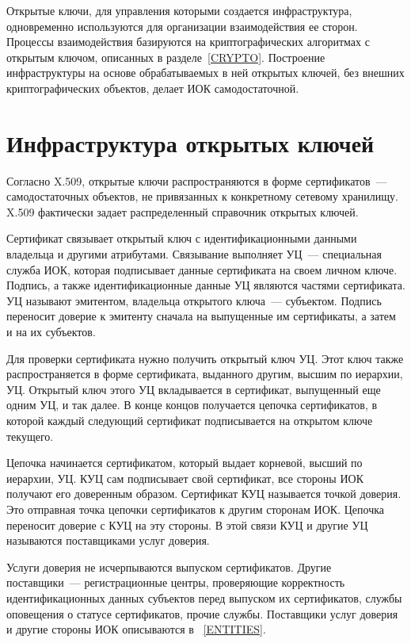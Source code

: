 Открытые ключи, для управления которыми создается инфраструктура,
одновременно используются для организации взаимодействия ее сторон.
%
Процессы взаимодействия базируются на криптографических алгоритмах 
с открытым ключом, описанных в разделе~\ref{CRYPTO}.
%
Построение инфраструктуры на основе обрабатываемых в ней открытых ключей,
без внешних криптографических объектов, делает ИОК самодостаточной.

\section{Инфраструктура открытых ключей}

Согласно X.509, открытые ключи распространяются в форме сертификатов~--- 
самодостаточных объектов, не привязанных к конкретному сетевому хранилищу. 
X.509 фактически задает распределенный справочник открытых ключей.  

Сертификат связывает открытый ключ с идентификационными данными владельца
и другими атрибутами. Связывание выполняет УЦ~--- специальная служба 
ИОК, которая  подписывает данные сертификата на своем личном ключе. Подпись,
а также идентификационные данные УЦ являются частями сертификата.
УЦ называют эмитентом, владельца открытого ключа~--- субъектом. Подпись 
переносит доверие к эмитенту сначала на выпущенные им сертификаты, а затем 
и на их субъектов. 

Для проверки сертификата нужно получить открытый ключ УЦ. 
Этот ключ также распространяется в форме сертификата, выданного другим, 
высшим по иерархии, УЦ. Открытый ключ этого УЦ вкладывается в сертификат,
выпущенный еще одним УЦ, и так далее. В конце концов получается цепочка сертификатов,
в которой каждый следующий сертификат подписывается на открытом ключе текущего.

Цепочка начинается сертификатом, который выдает корневой, высший по 
иерархии, УЦ. КУЦ сам подписывает свой сертификат, все стороны ИОК
получают его доверенным образом. Сертификат КУЦ называется точкой доверия. 
Это отправная точка цепочки сертификатов к другим сторонам ИОК. 
Цепочка переносит доверие с КУЦ на эту стороны. В этой связи КУЦ и другие 
УЦ называются поставщиками услуг доверия.

Услуги доверия не исчерпываются выпуском сертификатов.
Другие поставщики~--- регистрационные центры, проверяющие корректность 
идентификационных данных субъектов перед выпуском их сертификатов,
службы оповещения о статусе сертификатов, прочие службы.
%
Поставщики услуг доверия и другие стороны ИОК описываются в 
~\ref{ENTITIES}.

